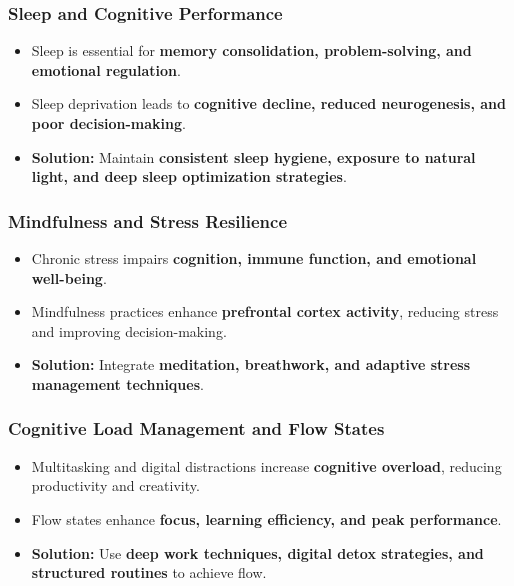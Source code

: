 \begin{frame}[fragile]\frametitle{Sleep and Cognitive Performance}
	\begin{itemize}
	\item Sleep is essential for \textbf{memory consolidation, problem-solving, and emotional regulation}.
	\item Sleep deprivation leads to \textbf{cognitive decline, reduced neurogenesis, and poor decision-making}.
	\item \textbf{Solution:} Maintain \textbf{consistent sleep hygiene, exposure to natural light, and deep sleep optimization strategies}.
	\end{itemize}
\end{frame}

\begin{frame}[fragile]\frametitle{Mindfulness and Stress Resilience}
	\begin{itemize}
	\item Chronic stress impairs \textbf{cognition, immune function, and emotional well-being}.
	\item Mindfulness practices enhance \textbf{prefrontal cortex activity}, reducing stress and improving decision-making.
	\item \textbf{Solution:} Integrate \textbf{meditation, breathwork, and adaptive stress management techniques}.
	\end{itemize}
\end{frame}

\begin{frame}[fragile]\frametitle{Cognitive Load Management and Flow States}
	\begin{itemize}
	\item Multitasking and digital distractions increase \textbf{cognitive overload}, reducing productivity and creativity.
	\item Flow states enhance \textbf{focus, learning efficiency, and peak performance}.
	\item \textbf{Solution:} Use \textbf{deep work techniques, digital detox strategies, and structured routines} to achieve flow.
	\end{itemize}
\end{frame}


